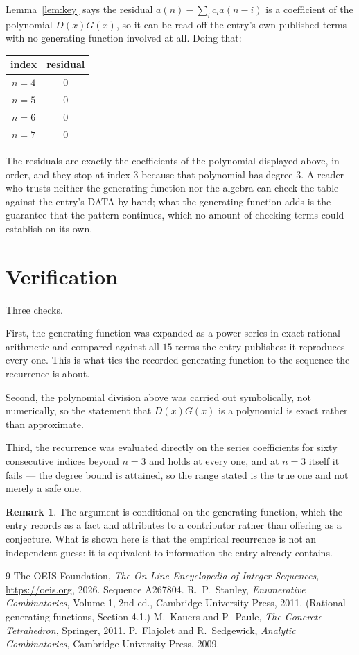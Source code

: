 \documentclass[11pt,a4paper]{article}
\theoremstyle{plain}
\theoremstyle{definition}
\newtheorem{remark}[theorem]{Remark}
\begin{document}
Lemma~\ref{lem:key} says the residual $a(n)-\sum_ic_ia(n-i)$ is a coefficient of the
polynomial $D(x)G(x)$, so it can be read off the entry's own published terms with no
generating function involved at all. Doing that:
\begin{center}
\begin{tabular}{cc}
index & residual \\ \hline
$n=4$ & $0$ \\
$n=5$ & $0$ \\
$n=6$ & $0$ \\
$n=7$ & $0$
\end{tabular}
\end{center}
The residuals are exactly the coefficients of the polynomial displayed above, in order, and
they stop at index $3$ because that polynomial has degree $3$. A reader who trusts
neither the generating function nor the algebra can check the table against the entry's DATA
by hand; what the generating function adds is the guarantee that the pattern continues, which
no amount of checking terms could establish on its own.

\section{Verification}

Three checks.

First, the generating function was expanded as a power series in exact rational arithmetic and
compared against all $15$ terms the entry publishes: it reproduces every one. This is
what ties the recorded generating function to the sequence the recurrence is about.

Second, the polynomial division above was carried out symbolically, not numerically, so the
statement that $D(x)G(x)$ is a polynomial is exact rather than approximate.

Third, the recurrence was evaluated directly on the series coefficients for sixty consecutive
indices beyond $n=3$ and holds at every one, and at $n=3$ itself it fails --- the
degree bound is attained, so the range stated is the true one and not merely a safe one.

\begin{remark}
The argument is conditional on the generating function, which the entry records as a fact and
attributes to a contributor rather than offering as a conjecture. What is shown here is that
the empirical recurrence is not an independent guess: it is equivalent to information the
entry already contains.
\end{remark}

\begin{thebibliography}{9}
 The OEIS Foundation, \emph{The On-Line Encyclopedia of Integer
Sequences}, \url{https://oeis.org}, 2026. Sequence A267804.
 R.~P.~Stanley, \emph{Enumerative Combinatorics}, Volume 1, 2nd ed.,
Cambridge University Press, 2011. (Rational generating functions, Section 4.1.)
 M.~Kauers and P.~Paule, \emph{The Concrete Tetrahedron}, Springer, 2011.
 P.~Flajolet and R.~Sedgewick, \emph{Analytic Combinatorics}, Cambridge
University Press, 2009.
\end{thebibliography}
\end{document}
